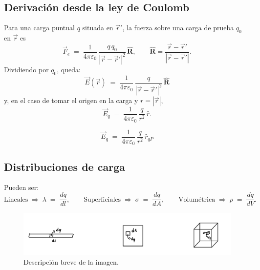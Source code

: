 \documentclass[a4paper,12pt]{article}
\begin{document}
\subsection*{Derivación desde la ley de Coulomb}
\noindent
Para una carga puntual $q$ situada en $\vec r'$, la fuerza sobre una carga de prueba $q_0$ en $\vec r$ es
\[
\vec F_e \;=\; \frac{1}{4\pi\varepsilon_0}\,\frac{q\,q_0}{|\vec r-\vec r'|^2}\,\hat{\mathbf R},
\qquad \hat{\mathbf R}=\frac{\vec r-\vec r'}{|\vec r-\vec r'|}.
\]
Dividiendo por $q_0$, queda:
\[
\boxed{\;\vec E(\vec r)\;=\;\frac{1}{4\pi\varepsilon_0}\,\frac{q}{|\vec r-\vec r'|^2}\,\hat{\mathbf R}\;}
\]
y, en el caso de tomar el origen en la carga y $r=|\vec r|$,
\[
\vec E_q \;=\; \frac{1}{4\pi\varepsilon_0}\,\frac{q}{r^2}\,\hat r .
\]
\begin{center}
\end{center}

\[
\vec E_q \;=\; \frac{1}{4\pi\varepsilon_0}\,\frac{q}{r^2}\,\hat r_{qP}
\]

\newpage

\subsection*{Distribuciones de carga}
\noindent
Pueden ser:
\[
\text{Lineales} \;\Rightarrow\; \lambda \;=\; \frac{dq}{dl},
\qquad
\text{Superficiales} \;\Rightarrow\; \sigma \;=\; \frac{dq}{dA},
\qquad
\text{Volumétrica} \;\Rightarrow\; \rho \;=\; \frac{dq}{dV}.
\]
\vspace{-2.0em}
\begin{figure}[h]
  \centering
  \includegraphics[width=1.0\textwidth]{imagen_2.jpeg}
  \caption{Descripción breve de la imagen.}
  \label{fig:imagen2}
\end{figure}
\end{document}
